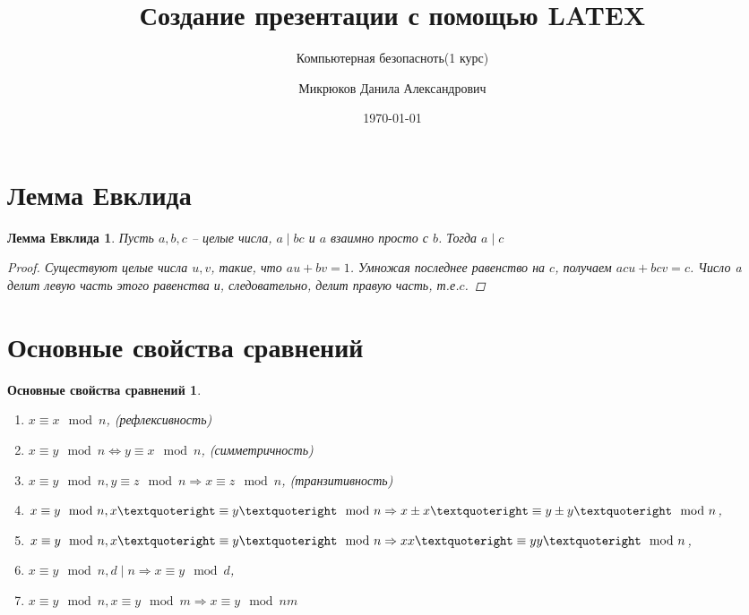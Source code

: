 \documentclass[handout]{beamer}
\title{Создание презентации с помощью LATEX}
\subtitle{Компьютерная безопасноть(1 курс)}
\author{Микрюков Данила Александрович}
\institute{Балтийский Федеральный Университет}
\date{\today}
\newtheorem*{mylem}{Лемма Евклида}
\newtheorem*{predl}{Основные свойства сравнений}
\begin{document}
\begin{frame}
\titlepage
\end{frame}

\section{Лемма Евклида}
\begin{frame}
\begin{mylem}
	Пусть $a, b, c$ -- целые числа, $a\mid bc$ и $a$ взаимно просто с $b$. Тогда $a\mid c$
	\begin{proof}
	Существуют целые числа $u, v$, такие, что $au + bv = 1$. Умножая последнее равенство на $c$, получаем $acu + bcv = c$. Число a делит левую часть этого равенства и, следовательно, делит правую часть, т.е.$c$. 
	\end{proof}
\end{mylem}
\end{frame}
\section{Основные свойства сравнений}

\begin{frame}
\begin{predl}
	\begin{enumerate}
		\item $x \equiv x \mod n$, (рефлексивность)
		\item $x \equiv  y \mod n \Leftrightarrow  y \equiv  x \mod n$, (симметричность)
		\item $x \equiv y \mod n, y \equiv z \mod n \Rightarrow x \equiv  z \mod n$, (транзитивность)
		\item $x \equiv  y \mod n, x\textquoteright \equiv  y\textquoteright \mod n \Rightarrow x \pm x\textquoteright \equiv  y \pm y\textquoteright \mod n$,
		\item $x \equiv  y \mod n, x\textquoteright \equiv  y\textquoteright \mod n \Rightarrow xx\textquoteright \equiv  yy\textquoteright \mod n$,
		\item $x \equiv  y \mod n, d\mid n \Rightarrow x \equiv  y \mod d$,
		\item $x \equiv  y \mod n, x \equiv  y \mod m \Rightarrow x \equiv  y \mod nm$
	\end{enumerate}
	 
\end{predl}	
\end{frame}
\end{document}
